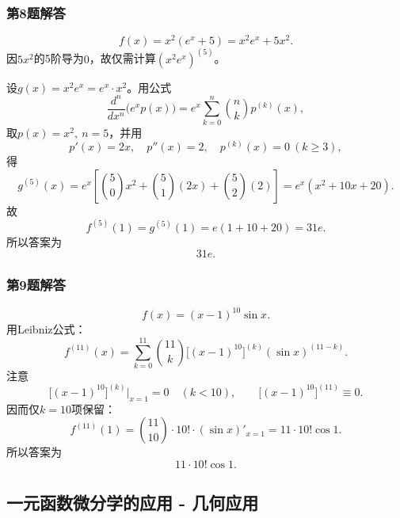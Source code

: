 \documentclass[./book.tex]{subfiles}
\begin{document}
    \subsubsection*{第8题解答}
    \begin{analysisbox}
        \[
            f(x)=x^2(e^x+5)=x^2e^x+5x^2.
        \]
        因$5x^2$的5阶导为$0$，故仅需计算$(x^2e^x)^{(5)}$。

        设$g(x)=x^2e^x=e^x\cdot x^2$。用公式
        \[
            \frac{d^n}{dx^n}\bigl(e^x p(x)\bigr)=e^x\sum_{k=0}^n\binom{n}{k}p^{(k)}(x),
        \]
        取$p(x)=x^2,\ n=5$，并用
        \[
            p'(x)=2x,\quad p''(x)=2,\quad p^{(k)}(x)=0\ (k\ge 3),
        \]
        得
        \[
            g^{(5)}(x)=e^x\left[\binom50x^2+\binom51(2x)+\binom52(2)\right]
            =e^x(x^2+10x+20).
        \]
        故
        \[
            f^{(5)}(1)=g^{(5)}(1)=e(1+10+20)=31e.
        \]
        所以答案为
        \[
            \boxed{31e}.
        \]
    \end{analysisbox}

    \subsubsection*{第9题解答}
    \begin{analysisbox}
        \[
            f(x)=(x-1)^{10}\sin x.
        \]
        用Leibniz公式：
        \[
            f^{(11)}(x)=\sum_{k=0}^{11}\binom{11}{k}\bigl[(x-1)^{10}\bigr]^{(k)}(\sin x)^{(11-k)}.
        \]
        注意
        \[
            \bigl[(x-1)^{10}\bigr]^{(k)}\Big|_{x=1}=0\quad (k<10),\qquad
            \bigl[(x-1)^{10}\bigr]^{(11)}\equiv 0.
        \]
        因而仅$k=10$项保留：
        \[
            f^{(11)}(1)=\binom{11}{10}\cdot 10!\cdot (\sin x)'_{x=1}
            =11\cdot 10!\cos 1.
        \]
        所以答案为
        \[
            \boxed{11\cdot 10!\cos 1}.
        \]
    \end{analysisbox}

    \subsection{一元函数微分学的应用 - 几何应用}
\end{document}
